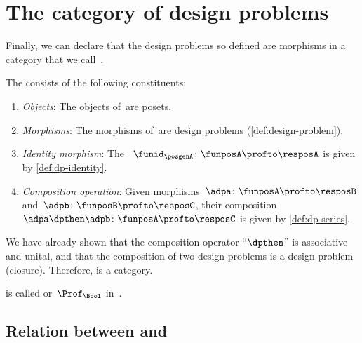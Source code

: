 
\section{The category of design problems \DP}

Finally, we can declare that the design problems so defined are morphisms in a category that we call~\DP.


\begin{definition}
    \label{def:DP}
    The \emph{ \DP} consists of the following constituents:
    \begin{enumerate}
        \item \emph{Objects}: The objects of~\DP are posets.
        \item \emph{Morphisms}: The morphisms of~\DP are design problems (\cref{def:design-problem}).
        \item \emph{Identity morphism}: The ~$\funid_\posgenA \colon \funposA \profto \resposA$ is given by \cref{def:dp-identity}.
        \item \emph{Composition operation}: Given morphisms~$\adpa \colon  \funposA \profto \resposB$ and~$\adpb \colon \funposB \profto \resposC$, their composition~$\adpa \dpthen \adpb\colon \funposA\profto \resposC$ is given by \cref{def:dp-series}.
    \end{enumerate}
\end{definition}

We have already shown that the composition operator ``$\dpthen$'' is associative and unital, and that the composition of two design problems is a design problem (closure).
Therefore, \DP is a category.

\DP is called \feas or~$\Prof_\Bool$ in~\cite{fong2019}.


\subsection{Relation between \DPI and \DP}

